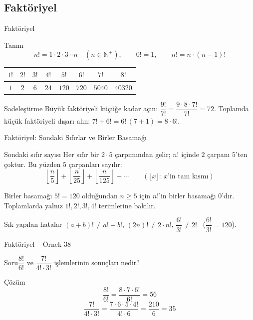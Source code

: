 \documentclass[aspectratio=169,11pt]{beamer}
\newcommand{\soru}[3]{%
\begin{frame}{#1}
  \begin{block}{Soru}\large #2\end{block}
  \pause
  \begin{exampleblock}{Çözüm}\large #3\end{exampleblock}
\end{frame}}
\begin{document}
\subsection{Faktöriyel}
\begin{frame}{Faktöriyel}
\begin{block}{Tanım}
\[n!=1\cdot 2\cdot 3\cdots n\quad(n\in\mathbb{N}^{+}),\qquad 0!=1,\qquad n!=n\cdot(n-1)!\]
\centering
\begin{tabular}{cccccccc}
\toprule
\(1!\) & \(2!\) & \(3!\) & \(4!\) & \(5!\) & \(6!\) & \(7!\) & \(8!\)\\\midrule
\(1\) & \(2\) & \(6\) & \(24\) & \(120\) & \(720\) & \(5040\) & \(40320\)\\\bottomrule
\end{tabular}
\end{block}
\begin{block}{Sadeleştirme}
Büyük faktöriyeli küçüğe kadar açın: \(\dfrac{9!}{7!}=\dfrac{9\cdot 8\cdot 7!}{7!}=72\). \quad Toplamda küçük faktöriyeli dışarı alın: \(7!+6!=6!\,(7+1)=8\cdot 6!\).
\end{block}
\end{frame}

\begin{frame}{Faktöriyel: Sondaki Sıfırlar ve Birler Basamağı}
\begin{block}{Sondaki sıfır sayısı}
Her sıfır bir \(2\cdot 5\) çarpımından gelir; \(n!\) içinde \(2\) çarpanı \(5\)'ten çoktur. Bu yüzden \(5\) çarpanları sayılır:
\[\left\lfloor\frac{n}{5}\right\rfloor+\left\lfloor\frac{n}{25}\right\rfloor+\left\lfloor\frac{n}{125}\right\rfloor+\cdots\qquad(\lfloor x\rfloor:\ x\text{'in tam kısmı})\]
\end{block}
\begin{block}{Birler basamağı}
\(5!=120\) olduğundan \(n\ge 5\) için \(n!\)'in birler basamağı \(0\)'dır. Toplamlarda yalnız \(1!,2!,3!,4!\) terimlerine bakılır.
\end{block}
\begin{alertblock}{Sık yapılan hatalar}
\((a+b)!\neq a!+b!\), \quad \((2n)!\neq 2\cdot n!\), \quad \(\dfrac{6!}{3!}\neq 2!\) \ (\(\dfrac{6!}{3!}=120\)).
\end{alertblock}
\end{frame}

\soru{Faktöriyel -- Örnek 38}
{\(\dfrac{8!}{6!}\) ve \(\dfrac{7!}{4!\cdot 3!}\) işlemlerinin sonuçları nedir?}
{\[\frac{8!}{6!}=\frac{8\cdot 7\cdot 6!}{6!}=56\]
\[\frac{7!}{4!\cdot 3!}=\frac{7\cdot 6\cdot 5\cdot 4!}{4!\cdot 6}=\frac{210}{6}=35\]}
\end{document}
